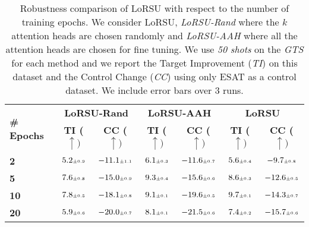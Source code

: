 \begin{table}
\caption{Robustness comparison of LoRSU with respect to the number of training epochs. We consider LoRSU, \emph{LoRSU-Rand} where the $k$ attention heads are chosen randomly and \emph{LoRSU-AAH} where all the attention heads are chosen for fine tuning. We use \emph{50 shots} on the \emph{GTS} for each method and we report the Target Improvement (\emph{TI}) on this dataset and the Control Change (\emph{CC}) using only ESAT as a control dataset.  We include error bars over 3 runs.}
 \label{table:lorsu_attn_rand_epochs}
\vskip 0.15in
\begin{center}
\begingroup
\setlength{\tabcolsep}{7.9pt}
\begin{tabular}{l c c c c c c}
\toprule
\multirow{2}{*}{\textbf{\# Epochs}} &  \multicolumn{2}{c}{\textbf{LoRSU-Rand}} & \multicolumn{2}{c}{\textbf{LoRSU-AAH}}  &  \multicolumn{2}{c}{\textbf{LoRSU}}  \\
 \cmidrule(lr){2-3}  \cmidrule(lr){4-5}  \cmidrule(lr){6-7} & \textbf{TI ($\uparrow)$} & \textbf{CC ($\uparrow)$} & \textbf{TI ($\uparrow)$} & \textbf{CC ($\uparrow)$} & \textbf{TI ($\uparrow)$} & \textbf{CC ($\uparrow)$} \\
\midrule
\textbf{2} & $5.2 \mbox{\tiny\ensuremath{\pm 0.9}}$ & $-11.1 \mbox{\tiny\ensuremath{\pm 1.1}}$ & $6.1 \mbox{\tiny\ensuremath{\pm 0.3}}$   & $-11.6 \mbox{\tiny\ensuremath{\pm 0.7}}$ & $5.6 \mbox{\tiny\ensuremath{\pm 0.4}}$ & $-9.7 \mbox{\tiny\ensuremath{\pm 0.8}}$  \\
\textbf{5} & $7.6 \mbox{\tiny\ensuremath{\pm 0.8}}$ & $-15.0 \mbox{\tiny\ensuremath{\pm 0.9}}$ & $9.3 \mbox{\tiny\ensuremath{\pm 0.4}}$ & $-15.6 \mbox{\tiny\ensuremath{\pm 0.6}}$ & $8.6 \mbox{\tiny\ensuremath{\pm 0.3}}$ & $-12.6 \mbox{\tiny\ensuremath{\pm 0.5}}$  \\
\textbf{10} & $7.8 \mbox{\tiny\ensuremath{\pm 0.5}}$ & $-18.1 \mbox{\tiny\ensuremath{\pm 0.8}}$ & $9.1 \mbox{\tiny\ensuremath{\pm 0.1}}$ & $-19.6 \mbox{\tiny\ensuremath{\pm 0.5}}$ & $9.7 \mbox{\tiny\ensuremath{\pm 0.1}}$ & $-14.3 \mbox{\tiny\ensuremath{\pm 0.7}}$  \\
\textbf{20} & $5.9 \mbox{\tiny\ensuremath{\pm 0.6}}$ & $-20.0 \mbox{\tiny\ensuremath{\pm 0.7}}$ & $8.1 \mbox{\tiny\ensuremath{\pm 0.1}}$ & $-21.5 \mbox{\tiny\ensuremath{\pm 0.6}}$ & $7.4 \mbox{\tiny\ensuremath{\pm 0.2}}$ & $-15.7 \mbox{\tiny\ensuremath{\pm 0.6}}$  \\
\bottomrule
\end{tabular}
\endgroup
\end{center}
\vskip -0.1in
\end{table}